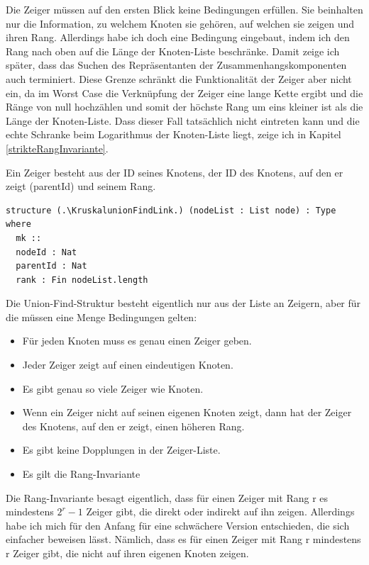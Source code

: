 Die Zeiger müssen auf den ersten Blick keine Bedingungen erfüllen.
Sie beinhalten nur die Information, zu welchem Knoten sie gehören, auf welchen sie zeigen und ihren Rang.
Allerdings habe ich doch eine Bedingung eingebaut, indem ich den Rang nach oben auf die Länge der Knoten-Liste beschränke.
Damit zeige ich später, dass das Suchen des Repräsentanten der Zusammenhangskomponenten auch terminiert.
Diese Grenze schränkt die Funktionalität der Zeiger aber nicht ein, da im Worst Case die Verknüpfung der Zeiger eine lange Kette ergibt und die Ränge von null hochzählen
und somit der höchste Rang um eins kleiner ist als die Länge der Knoten-Liste.
Dass dieser Fall tatsächlich nicht eintreten kann und die echte Schranke beim Logarithmus der Knoten-Liste liegt, zeige ich in Kapitel \ref{strikteRangInvariante}.

\begin{definition}[\KruskalunionFindLink]
  Ein Zeiger besteht aus der ID seines Knotens, der ID des Knotens, auf den er zeigt (parentId) und seinem Rang.
\end{definition}
\begin{lstlisting}
structure (.\KruskalunionFindLink.) (nodeList : List node) : Type where
  mk ::
  nodeId : Nat
  parentId : Nat
  rank : Fin nodeList.length
\end{lstlisting}

Die Union-Find-Struktur besteht eigentlich nur aus der Liste an Zeigern, aber für die müssen eine Menge Bedingungen gelten:

\begin{itemize}
    \item Für jeden Knoten muss es genau einen Zeiger geben.
    \item Jeder Zeiger zeigt auf einen eindeutigen Knoten.
    \item Es gibt genau so viele Zeiger wie Knoten.
    \item Wenn ein Zeiger nicht auf seinen eigenen Knoten zeigt, dann hat der Zeiger des Knotens, auf den er zeigt, einen höheren Rang.
    \item Es gibt keine Dopplungen in der Zeiger-Liste.
    \item Es gilt die Rang-Invariante
\end{itemize}

Die Rang-Invariante besagt eigentlich, dass für einen Zeiger mit Rang r es mindestens $2^r-1$ Zeiger gibt, die direkt oder indirekt auf ihn zeigen.
Allerdings habe ich mich für den Anfang für eine schwächere Version entschieden, die sich einfacher beweisen lässt.
Nämlich, dass es für einen Zeiger mit Rang r mindestens r Zeiger gibt, die nicht auf ihren eigenen Knoten zeigen.

